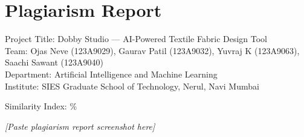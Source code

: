 \chapter*{Plagiarism Report}
Project Title: Dobby Studio — AI-Powered Textile Fabric Design Tool \\
Team: Ojas Neve (123A9029), Gaurav Patil (123A9032), 
      Yuvraj K (123A9063), Saachi Sawant (123A9040) \\
Department: Artificial Intelligence and Machine Learning \\
Institute: SIES Graduate School of Technology, Nerul, Navi Mumbai \\

\vspace{1cm}

\noindent Similarity Index: \underline{\hspace{2cm}}\% \\

\vspace{1cm}

\textit{[Paste plagiarism report screenshot here]}

